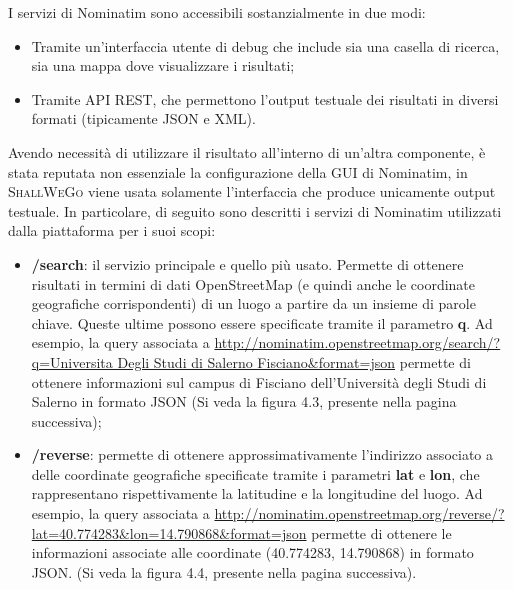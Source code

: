         I servizi di Nominatim sono accessibili sostanzialmente in due modi: 
        
        \begin{itemize}
            \item Tramite un'interfaccia utente di debug che include sia una casella di ricerca, sia una mappa dove visualizzare i risultati;
            \item Tramite API REST, che permettono l'output testuale dei risultati in diversi formati (tipicamente JSON e XML).
        \end{itemize}

        Avendo necessità di utilizzare il risultato all’interno di un’altra componente, è stata reputata non essenziale la configurazione della GUI di Nominatim, in \textsc{ShallWeGo} viene usata solamente l'interfaccia che produce unicamente output testuale.
        In particolare, di seguito sono descritti i servizi di Nominatim utilizzati dalla piattaforma per i suoi scopi:

        \begin{itemize}
            \item \textbf{/search}: il servizio principale e quello più usato. Permette di ottenere risultati in termini di dati OpenStreetMap (e quindi anche le coordinate geografiche corrispondenti) di un luogo a partire da un insieme di parole chiave. Queste ultime possono essere specificate tramite il parametro \textbf{q}. Ad esempio, la query associata a  \url{http://nominatim.openstreetmap.org/search/?q=Universita Degli Studi di Salerno Fisciano&format=json} permette di ottenere informazioni sul campus di Fisciano dell'Università degli Studi di Salerno in formato JSON (Si veda la figura 4.3, presente nella pagina successiva);
            \newpage
            \item \textbf{/reverse}: permette di ottenere approssimativamente l'indirizzo associato a delle coordinate geografiche specificate tramite i parametri \textbf{lat} e \textbf{lon}, che rappresentano rispettivamente la latitudine e la longitudine del luogo. Ad esempio, la query associata a \url{http://nominatim.openstreetmap.org/reverse/?lat=40.774283&lon=14.790868&format=json} permette di ottenere le informazioni associate alle coordinate (40.774283, 14.790868) in formato JSON. (Si veda la figura 4.4, presente nella pagina successiva).
        \end{itemize}

